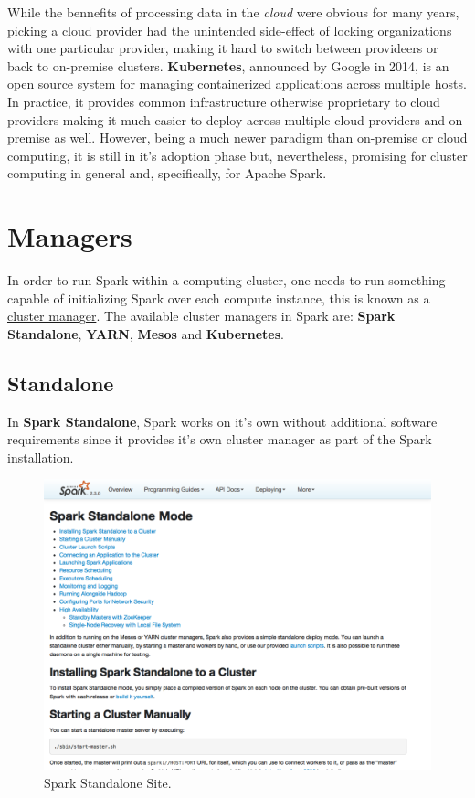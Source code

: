 \documentclass[]{book}
\theoremstyle{definition}
\theoremstyle{definition}
\theoremstyle{definition}
\theoremstyle{remark}
\begin{document}
While the bennefits of processing data in the \emph{cloud} were obvious
for many years, picking a cloud provider had the unintended side-effect
of locking organizations with one particular provider, making it hard to
switch between provideers or back to on-premise clusters.
\textbf{Kubernetes}, announced by Google in 2014, is an
\href{https://github.com/kubernetes/kubernetes/}{open source system for
managing containerized applications across multiple hosts}. In practice,
it provides common infrastructure otherwise proprietary to cloud
providers making it much easier to deploy across multiple cloud
providers and on-premise as well. However, being a much newer paradigm
than on-premise or cloud computing, it is still in it's adoption phase
but, nevertheless, promising for cluster computing in general and,
specifically, for Apache Spark.

\hypertarget{managers}{%
\section{Managers}\label{managers}}

In order to run Spark within a computing cluster, one needs to run
something capable of initializing Spark over each compute instance, this
is known as a
\href{https://en.wikipedia.org/wiki/Cluster_manager}{cluster manager}.
The available cluster managers in Spark are: \textbf{Spark Standalone},
\textbf{YARN}, \textbf{Mesos} and \textbf{Kubernetes}.

\hypertarget{clusters-standalone}{%
\subsection{Standalone}\label{clusters-standalone}}

In \textbf{Spark Standalone}, Spark works on it's own without additional
software requirements since it provides it's own cluster manager as part
of the Spark installation.

\begin{figure}

{\centering \includegraphics[width=13.78in]{images/05-clusters-spark-standalone} 

}

\caption{Spark Standalone Site.}\label{fig:spark-standalone}
\end{figure}
\end{document}
